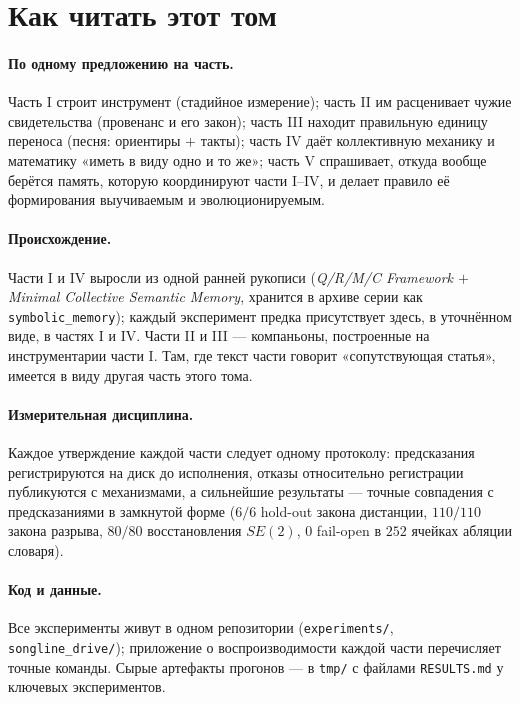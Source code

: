 \documentclass{article}
\begin{document}
\section*{Как читать этот том}

\paragraph{По одному предложению на часть.} Часть I строит инструмент
(стадийное измерение); часть II им расценивает чужие свидетельства
(провенанс и его закон); часть III находит правильную единицу
переноса (песня: ориентиры $+$ такты); часть IV даёт коллективную
механику и математику «иметь в виду одно и то же»; часть V
спрашивает, откуда вообще берётся память, которую координируют части
I--IV, и делает правило её формирования выучиваемым и
эволюционируемым.

\paragraph{Происхождение.} Части I и IV выросли из одной ранней
рукописи (\emph{Q/R/M/C Framework $+$ Minimal Collective Semantic
Memory}, хранится в архиве серии как \texttt{symbolic\_memory});
каждый эксперимент предка присутствует здесь, в уточнённом виде, в
частях I и IV. Части II и III --- компаньоны, построенные на
инструментарии части I. Там, где текст части говорит
«сопутствующая статья», имеется в виду другая часть этого тома.

\paragraph{Измерительная дисциплина.} Каждое утверждение каждой части
следует одному протоколу: предсказания регистрируются на диск до
исполнения, отказы относительно регистрации публикуются с
механизмами, а сильнейшие результаты --- точные совпадения с
предсказаниями в замкнутой форме ($6/6$ hold-out закона дистанции,
$110/110$ закона разрыва, $80/80$ восстановления $SE(2)$, $0$
fail-open в $252$ ячейках абляции словаря).

\paragraph{Код и данные.} Все эксперименты живут в одном репозитории
(\texttt{experiments/}, \texttt{songline\_drive/}); приложение о
воспроизводимости каждой части перечисляет точные команды. Сырые
артефакты прогонов --- в \texttt{tmp/} с файлами \texttt{RESULTS.md}
у ключевых экспериментов.
\end{document}
